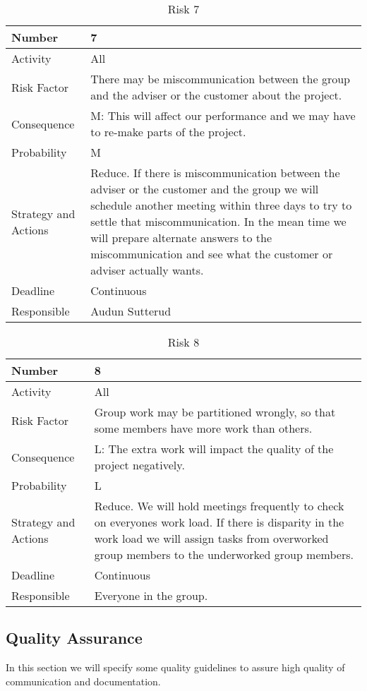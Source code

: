 \documentclass[../document.tex]{subfiles}
\begin{document}
\begin{table}[H]
\caption{Risk 7}
\begin{tabularx}{\textwidth}{|l|X|}
\hline
Number
&7
\\ \hline Activity
&All
\\ \hline Risk Factor
&There may be miscommunication between the group and the adviser or the customer about the project.
\\ \hline Consequence
&M: This will affect our performance and we may have to re-make parts of the project.
\\ \hline Probability
&M
\\ \hline Strategy and Actions
&Reduce. If there is miscommunication between the adviser or the customer and the group we will schedule another meeting within three days to try to settle that miscommunication. In the mean time we will prepare alternate answers to the miscommunication and see what the customer or adviser actually wants.
\\ \hline Deadline
&Continuous
\\ \hline Responsible
&Audun Sutterud
\\ \hline 
\end{tabularx}
\end{table}

\begin{table}[H]
\caption{Risk 8}
\begin{tabularx}{\textwidth}{|l|X|}
\hline
Number
&8
\\ \hline Activity
&All
\\ \hline Risk Factor
&Group work may be partitioned wrongly, so that some members have more work than others.
\\ \hline Consequence
&L: The extra work will impact the quality of the project negatively.
\\ \hline Probability
&L
\\ \hline Strategy and Actions
&Reduce. We will hold meetings frequently to check on everyones work load. If there is disparity in the work load we will assign tasks from overworked group members to the underworked group members.
\\ \hline Deadline
&Continuous
\\ \hline Responsible
&Everyone in the group.
\\ \hline 
\end{tabularx}
\end{table}

\subsection{Quality Assurance}
In this section we will specify some quality guidelines to assure high quality of communication and documentation.
\end{document}
